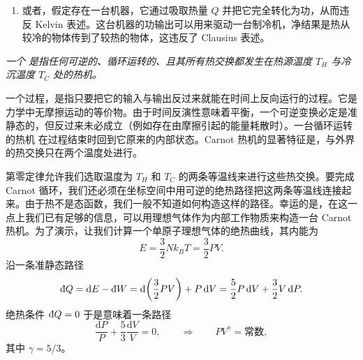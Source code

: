 
\begin{enumerate}[label=(\alph*), leftmargin=2.2em, start=2, itemsep=0.3em]
  \item 或者，假定存在一台机器，它通过吸取热量 $Q$ 并把它完全转化为功，从而违反 Kelvin 表述。这台机器的功输出可以用来驱动一台制冷机，净结果是热从较冷的物体传到了较热的物体，这违反了 Clausius 表述。
\end{enumerate}



\emph{一个  是指任何可逆的、循环运转的、且其所有热交换都发生在热源温度 $T_H$ 与冷沉温度 $T_C$ 处的热机。}


一个过程，是指只要把它的输入与输出反过来就能在时间上反向运行的过程。它是力学中无摩擦运动的等价物。由于时间反演性意味着平衡，一个可逆变换必定是准静态的，但反过来未必成立（例如存在由摩擦引起的能量耗散时）。一台循环运转的热机
在过程结束时回到它原来的内部状态。Carnot 热机的显著特征是，与外界的热交换只在两个温度处进行。

第零定律允许我们选取温度为 $T_H$ 和 $T_C$ 的两条等温线来进行这些热交换。要完成 Carnot 循环，我们还必须在坐标空间中用可逆的绝热路径把这两条等温线连接起来。由于热不是态函数，我们一般不知道如何构造这样的路径。幸运的是，在这一点上我们已有足够的信息，可以用理想气体作为内部工作物质来构造一台 Carnot 热机。为了演示，让我们计算一个单原子理想气体的绝热曲线，其内能为
\begin{equation*}
E=\frac{3}{2}Nk_BT=\frac{3}{2}PV.
\end{equation*}
沿一条准静态路径
\begin{equation}
\inexd Q=\mathrm{d}E-\inexd W=\mathrm{d}\!\left(\frac{3}{2}PV\right)+P\,\mathrm{d}V=\frac{5}{2}P\,\mathrm{d}V+\frac{3}{2}V\,\mathrm{d}P.
\label{eq:1.18}
\end{equation}
绝热条件 $\inexd Q=0$ 于是意味着一条路径
\begin{equation}
\frac{\mathrm{d}P}{P}+\frac{5}{3}\frac{\mathrm{d}V}{V}=0,\qquad\Longrightarrow\qquad PV^{\gamma}=\text{常数},
\label{eq:1.19}
\end{equation}
其中 $\gamma=5/3$。

